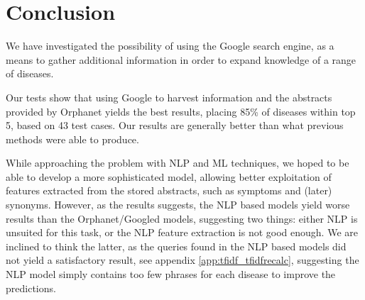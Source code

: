 \documentclass[10pt,letterpaper,final]{article}
\begin{document}
\section{Conclusion}
\label{chap:conclusion}
We have investigated the possibility of using the Google search engine,
as a means to gather additional information in order to expand knowledge
of a range of diseases.



Our tests show that using Google to harvest information and the
abstracts provided by Orphanet yields the best results, placing 85\% of
diseases within top 5, based on 43 test cases. Our results are
generally better than what previous methods were able to produce.


While approaching the problem with NLP and ML techniques, we hoped to be
able to develop a more sophisticated model, allowing better exploitation
of features extracted from the stored abstracts, such as symptoms and
(later) synonyms. However, as the results suggests, the NLP based models
yield worse results than the Orphanet/Googled models, suggesting two
things: either NLP is unsuited for this task, or the NLP feature
extraction is not good enough. We are inclined to think the latter, as
the queries found in the NLP based models did not yield a satisfactory
result, see appendix \ref{app:tfidf_tfidfrecalc}, suggesting the NLP
model simply contains too few phrases for each disease to improve the
predictions.
\end{document}
